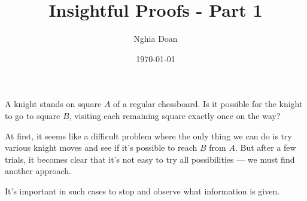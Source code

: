 \documentclass{article}
\title{Insightful Proofs - Part 1}
\author{Nghia Doan}
\date{\today}
\begin{document}
\maketitle

\begin{example}\label{example:knight-tour-parity}
    A knight stands on square \( A \) of a regular chessboard. Is it possible for the knight to go to square \( B \), visiting each remaining square exactly once on the way?
      
\end{example}

\begin{analysis*}
    At first, it seems like a difficult problem where the only thing we can do is try various knight moves and see if it's possible to reach \( B \) from \( A \). But after a few trials, it becomes clear that it’s not easy to try all possibilities — we must find another approach.

    It’s important in such cases to stop and observe what information is given.
\end{analysis*}
\end{document}
